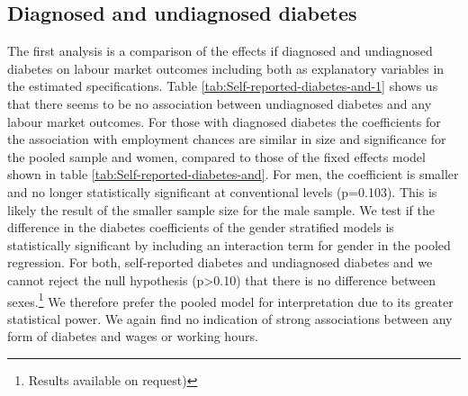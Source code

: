 \subsection{Diagnosed and undiagnosed diabetes}

The first analysis is a comparison of the effects if diagnosed and
undiagnosed diabetes on labour market outcomes including both as explanatory
variables in the estimated specifications. Table \ref{tab:Self-reported-diabetes-and-1}
shows us that there seems to be no association between undiagnosed
diabetes and any labour market outcomes. For those with diagnosed
diabetes the coefficients for the association with employment chances
are similar in size and significance for the pooled sample and women,
compared to those of the fixed effects model shown in table \ref{tab:Self-reported-diabetes-and}.
For men, the coefficient is smaller and no longer statistically significant
at conventional levels (p=0.103). This is likely the result of the
smaller sample size for the male sample. We test if the difference
in the diabetes coefficients of the gender stratified models is statistically
significant by including an interaction term for gender in the pooled
regression. For both, self-reported diabetes and undiagnosed diabetes
and we cannot reject the null hypothesis (p>0.10) that there is no
difference between sexes.\footnote{Results available on request)}
We therefore prefer the pooled model for interpretation due to its
greater statistical power. We again find no indication of strong associations
between any form of diabetes and wages or working hours. 

